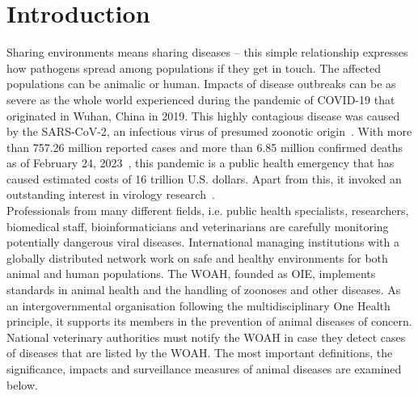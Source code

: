 \chapter{Introduction}\label{chap:introduction}

Sharing environments means sharing diseases -- this simple relationship expresses how pathogens spread among populations if they get in touch. The affected populations can be animalic or human. Impacts of disease outbreaks can be as severe as the whole world experienced during the pandemic of \ac{COVID-19} that originated in Wuhan, China in 2019. This highly contagious disease was caused by the \ac{SARS-CoV-2}, an infectious virus of presumed zoonotic origin~\cite{wu2020new}. With more than 757.26 million reported cases and more than 6.85 million confirmed deaths as of February 24, 2023~, this pandemic is a public health emergency that has caused estimated costs of 16 trillion U.S. dollars. Apart from this, it invoked an outstanding interest in virology research~\cite{covid}. \\
Professionals from many different fields, i.e. public health specialists, researchers, biomedical staff, bioinformaticians and veterinarians are carefully monitoring potentially dangerous viral diseases. International managing institutions with a globally distributed network work on safe and healthy environments for both animal and human populations. The \ac{WOAH}, founded as \ac{OIE}, implements standards in animal health and the handling of zoonoses and other diseases. As an intergovernmental organisation following the multidisciplinary One Health principle, it supports its members in the prevention of animal diseases of concern. National veterinary authorities must notify the \ac{WOAH} in case they detect cases of diseases that are listed by the \ac{WOAH}. The most important definitions, the significance, impacts and surveillance measures of animal diseases are examined below.

